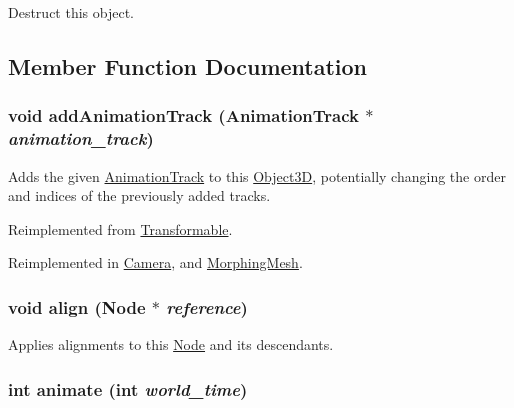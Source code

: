 Destruct this object. 

\subsection{Member Function Documentation}
\hypertarget{classm3g_1_1Node_415c0b110f95410ded9b85e5d99a496b}{
\subsubsection[{addAnimationTrack}]{\setlength{\rightskip}{0pt plus 5cm}void addAnimationTrack ({\bf AnimationTrack} $\ast$ {\em animation\_\-track})}}
\label{classm3g_1_1Node_415c0b110f95410ded9b85e5d99a496b}


Adds the given \hyperlink{classm3g_1_1AnimationTrack}{AnimationTrack} to this \hyperlink{classm3g_1_1Object3D}{Object3D}, potentially changing the order and indices of the previously added tracks. 

Reimplemented from \hyperlink{classm3g_1_1Transformable_415c0b110f95410ded9b85e5d99a496b}{Transformable}.

Reimplemented in \hyperlink{classm3g_1_1Camera_415c0b110f95410ded9b85e5d99a496b}{Camera}, and \hyperlink{classm3g_1_1MorphingMesh_415c0b110f95410ded9b85e5d99a496b}{MorphingMesh}.\hypertarget{classm3g_1_1Node_3db1b4be060fe3d4f3dbf9720ef85234}{
\subsubsection[{align}]{\setlength{\rightskip}{0pt plus 5cm}void align ({\bf Node} $\ast$ {\em reference})}}
\label{classm3g_1_1Node_3db1b4be060fe3d4f3dbf9720ef85234}


Applies alignments to this \hyperlink{classm3g_1_1Node}{Node} and its descendants. \hypertarget{classm3g_1_1Node_8aad1ceab4c2a03609c8a42324ce484d}{
\subsubsection[{animate}]{\setlength{\rightskip}{0pt plus 5cm}int animate (int {\em world\_\-time})}}
\label{classm3g_1_1Node_8aad1ceab4c2a03609c8a42324ce484d}


